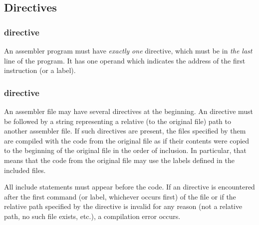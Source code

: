 \subsection{Directives}

\subsubsection{ directive}

\vspace{-0.2cm}

An assembler program must have \textit{exactly one}  directive,
which must be in \textit{the last} line of the program.
It has one operand which indicates the address of the first instruction
(or a label).

\vspace{-0.35cm}

\subsubsection{ directive}

\vspace{-0.2cm}

An assembler file may have several  directives at the beginning.
An  directive must be followed by a string representing a relative
(to the original file) path to another assembler file.
If such directives are present, the files specified by them are compiled with
the code from the original file as if their contents were copied to
the beginning of the original file in the order of inclusion.
In particular, that means that the code from the original file may use
the labels defined in the included files.

All include statements must appear before the code.
If an  directive is encountered after the first command
(or label, whichever occurs first) of the file or if the relative path
specified by the directive is invalid for any reason (not a relative path,
no such file exists, etc.), a compilation error occurs.
